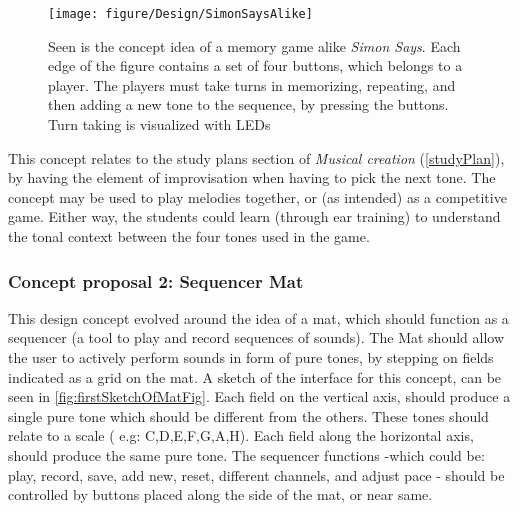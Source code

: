 \begin{figure}[H]
	\centering
	\texttt{[image: figure/Design/SimonSaysAlike]} 
	\caption{Seen is the concept idea of a memory game alike \textit{Simon Says}. Each edge of the figure contains a set of four buttons, which belongs to a player. The players must take turns in memorizing, repeating, and then adding a new tone to the sequence, by pressing the buttons. Turn taking is visualized with LEDs}
	\label{fig:SimonSaysAlike}
\end{figure}

This concept relates to the study plans section of \textit{Musical creation }(\autoref{studyPlan}), by having the element of improvisation when having to pick the next tone. The concept may be used to play melodies together, or (as intended) as a competitive game. Either way, the students could learn (through ear training) to understand the tonal context between the four tones used in the game.   

\subsubsection{Concept proposal 2: Sequencer Mat}\label{sequencerMat}
This design concept evolved around the idea of a mat, which should function as a sequencer (a tool to play and record sequences of sounds). The Mat should allow the user to actively perform sounds in form of pure tones, by stepping on fields indicated as a grid on the mat. A sketch of the interface for this concept, can be seen in \autoref{fig:firstSketchOfMatFig}. Each field on the vertical axis, should produce a single pure tone which should be different from the others. These tones should relate to a scale ( e.g:  C,D,E,F,G,A,H). Each field along the horizontal axis, should produce the same pure tone. The sequencer functions -which could be: play, record, save, add new, reset, different channels, and adjust pace - should be controlled by buttons placed along the side of the mat, or near same.     

